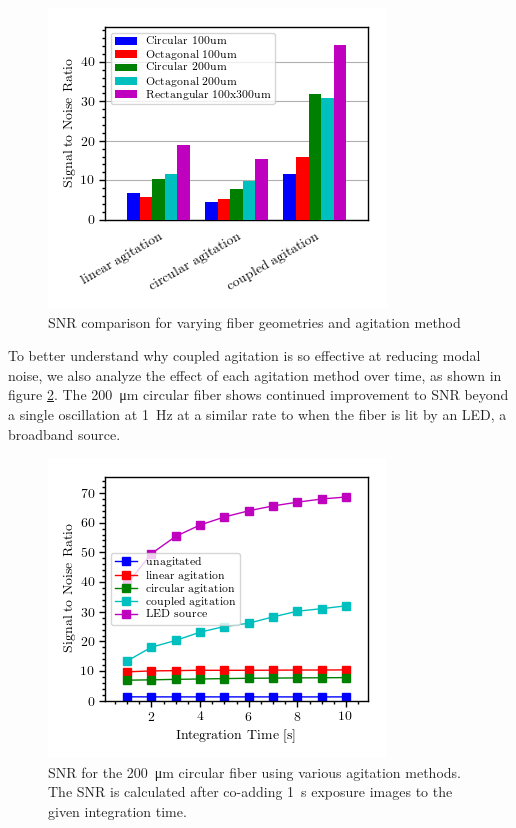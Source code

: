 \documentclass[twocolumn]{emulateapj}
\begin{document}
\begin{figure}
\centering
	\includegraphics[width=\columnwidth]{images/geom_snr.png}
	\caption{SNR comparison for varying fiber geometries and agitation method}
\label{fig:geom_snr}
\end{figure}

To better understand why coupled agitation is so effective at reducing modal noise, we also analyze the effect of each agitation method over time, as shown in figure \ref{fig:circ_snr_vs_time}. The \SI{200}{\micro\meter} circular fiber shows continued improvement to SNR beyond a single oscillation at \SI{1}{\hertz} at a similar rate to when the fiber is lit by an LED, a broadband source.

\begin{figure}
\centering
	\includegraphics[width=\columnwidth]{images/circ_snr_vs_time.png}
	\caption{SNR for the \SI{200}{\micro\meter} circular fiber using various agitation methods. The SNR is calculated after co-adding \SI{1}{\second} exposure images to the given integration time.}
\label{fig:circ_snr_vs_time}
\end{figure}
\end{document}
